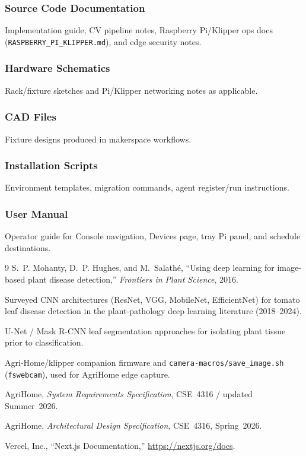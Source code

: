 \documentclass[11pt,letterpaper]{article}
\begin{document}
\subsubsection{Source Code Documentation}
Implementation guide, CV pipeline notes, Raspberry Pi/Klipper ops docs (\texttt{RASPBERRY\_PI\_KLIPPER.md}), and edge security notes.

\subsubsection{Hardware Schematics}
Rack/fixture sketches and Pi/Klipper networking notes as applicable.

\subsubsection{CAD Files}
Fixture designs produced in makerspace workflows.

\subsubsection{Installation Scripts}
Environment templates, migration commands, agent register/run instructions.

\subsubsection{User Manual}
Operator guide for Console navigation, Devices page, tray Pi panel, and schedule destinations.

\newpage
\begin{thebibliography}{9}
S.~P. Mohanty, D.~P. Hughes, and M.~Salath\'{e}, ``Using deep learning for image-based plant disease
detection,'' \textit{Frontiers in Plant Science}, 2016.

Surveyed CNN architectures (ResNet, VGG, MobileNet, EfficientNet) for tomato leaf disease
detection in the plant-pathology deep learning literature (2018--2024).

U-Net / Mask R-CNN leaf segmentation approaches for isolating plant tissue prior to classification.

Agri-Home/klipper companion firmware and \texttt{camera-macros/save\_image.sh} (\texttt{fswebcam}), used for AgriHome edge
capture.

AgriHome, \textit{System Requirements Specification}, CSE~4316 / updated Summer~2026.

AgriHome, \textit{Architectural Design Specification}, CSE~4316, Spring~2026.

Vercel, Inc., ``Next.js Documentation,'' \url{https://nextjs.org/docs}.
\end{thebibliography}
\end{document}
